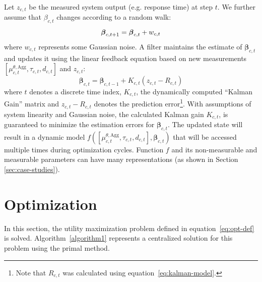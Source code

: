 Let $z_{c,t}$ be the measured system output (e.g. response time) at step $t$. 
We further assume that $\beta_{c,t}$ changes according to a random walk:
\begin{equation}
	\boldsymbol\beta_{c,t+1}=\boldsymbol\beta_{c,t}+w_{c,t} \\
\end{equation}
where $w_{c,t}$ represents some Gaussian noise.
A filter maintains the estimate of $\boldsymbol\beta_{c,t}$ and updates it using the linear feedback equation based on new measurements $\left[\mu^{\theta,\text{Agg}}_{c,t},\tau_{c,t},d_{c,t}\right]$ and $z_{c,t}$: 
\begin{equation}\label{eq:kalman-update} 
	\boldsymbol\beta_{c,t} = \boldsymbol\beta_{c,t-1}+ K_{c,t}(z_{c,t} - R_{c,t})
\end{equation}
where $t$ denotes a discrete time index, $K_{c,t}$, the dynamically computed
``Kalman Gain'' matrix and $z_{c,t}-R_{c,t}$ denotes the prediction error\footnote{Note that $R_{c,t}$ was calculated using equation~\ref{eq:kalman-model}.}. With assumptions of system linearity and Gaussian noise, the calculated Kalman gain $K_{c,t}$, is guaranteed to minimize the 
estimation errors for $\boldsymbol\beta_{c,t}$. The updated state will result in a dynamic
model $f(\left[\mu^{\theta,\text{Agg}}_{c,t},\tau_{c,t},d_{c,t}\right],\boldsymbol\beta_{c,t})$ that will be accessed multiple times during optimization cycles. 
Function $f$ and its non-measurable and measurable parameters can have many representations (as shown in Section \ref{sec:case-studies}). 

\section{Optimization}
\label{sec:optimization-through-subgradient}
In this section, the utility maximization problem defined in equation~\ref{eq:opt-def} is solved. Algorithm~\ref{algorithm1} represents a centralized solution for this problem using the primal method.  


